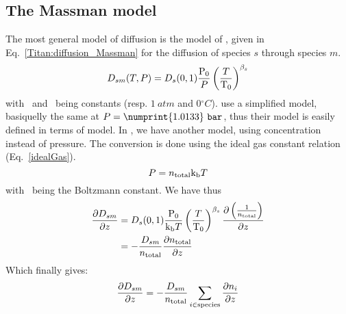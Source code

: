 \subsection{The Massman model}

The most general model of diffusion is the model of \citet{Massman1998}, given
in Eq.~\ref{Titan:diffusion_Massman} for the diffusion of species $s$ through
species $m$.
\begin{equation}
D_{sm}(T,P) = D_s(0,1) \frac{\mathrm{P_0}}{P}\left(\frac{T}{\mathrm{T_0}}\right)^{\beta_s}
\label{Titan:diffusion_Massman}
\end{equation}
with \Pz\ and \Tz\ being constants (resp. $1~\unit{atm}$ and $0\unit{^\circ C}$).
\citet{Wakeham1973} use a simplified model, basiquelly the same at $P=\numprint{1.0133}~\unit{bar}$, thus
their model is easily defined in terms of \citet{Massman1998} model. In \citet{WilsonPhD,Haye2005},
we have another model, using concentration instead of pressure. The conversion is done
using the ideal gas constant relation (Eq.~\ref{idealGas}).
\begin{equation}
P = n_\text{total}\text{k}_\text{b} T
\label{idealGas}
\end{equation}
with \kb\ being the Boltzmann constant.
We have thus
\begin{equation}
\begin{split}
\frac{\partial D_{sm}}{\partial z} & = D_s(0,1) \frac{\mathrm{P_0}}{\text{k}_\text{b} T}\left(\frac{T}{\mathrm{T_0}}\right)^{\beta_s} \frac{\partial\left(\frac{1}{n_\text{total}}\right)}{\partial z}\\
                       & = -\frac{D_{sm}}{n_\text{total}}\frac{\partial n_\text{total}}{\partial z}
\end{split}
\end{equation}
Which finally gives:
\begin{equation}
\frac{\partial D_{sm}}{\partial z}  = -\frac{D_{sm}}{n_\text{total}}\sum_{i\in\text{species}}\frac{\partial n_i}{\partial z}
\label{Titan:Massman_derive}
\end{equation}

